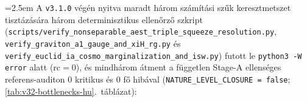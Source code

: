 \documentclass[11pt,a4paper]{article}
\begin{document}
{\emergencystretch=2.5em
A \texttt{v3.1.0} végén nyitva maradt három számítási szűk keresztmetszet tisztázására három determinisztikus ellenőrző szkript (\texttt{scripts/\allowbreak verify\_\allowbreak nonseparable\_\allowbreak aest\_\allowbreak triple\_\allowbreak squeeze\_\allowbreak resolution.py}, \texttt{verify\_\allowbreak graviton\_\allowbreak a1\_\allowbreak gauge\_\allowbreak and\_\allowbreak xiH\_\allowbreak rg.py} és \texttt{verify\_\allowbreak euclid\_\allowbreak ia\_\allowbreak cosmo\_\allowbreak marginalization\_\allowbreak and\_\allowbreak isw.py}) futott le \texttt{python3 -W error} alatt ($\mathrm{rc}=0$), és mindhárom átment a független Stage-A ellenséges referens-auditon $0$ kritikus és $0$ fő hibával (\texttt{NATURE\_\allowbreak LEVEL\_\allowbreak CLOSURE = false}; \ref{tab:v32-bottlenecks-hu}.~táblázat):

}
\end{document}
